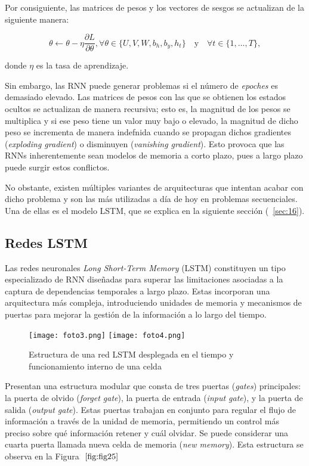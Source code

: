 \documentclass[12pt,twoside]{article}
\begin{document}
Por consiguiente, las matrices de pesos y los vectores de sesgos se actualizan de la siguiente manera: 

\begin{equation}
\theta \leftarrow \theta - \eta  \frac{\partial L}{\partial \theta}, \forall \theta \in \{U,V,W,b_h,b_y, h_t \} \text{  }\text{ y }\text{  } \forall t \in \{ 1,...,T\},
\end{equation}

donde $\eta$ es la tasa de aprendizaje.

Sin embargo, las RNN puede generar problemas si el número de \textit{epoches} es demasiado elevado. Las matrices de pesos con las que se obtienen los estados ocultos se actualizan de manera recursiva; esto es, la magnitud de los pesos se multiplica y si ese peso tiene un valor muy bajo o elevado, la magnitud de dicho peso se incrementa de manera indefnida cuando se propagan dichos gradientes (\textit{exploding gradient}) o disminuyen (\textit{vanishing gradient}). Esto provoca que las RNNs inherentemente sean modelos de memoria a corto plazo, pues a largo plazo puede surgir estos conflictos.

No obstante, existen múltiples variantes de arquitecturas que intentan acabar con dicho problema y son las más utilizadas a día de hoy en problemas secuenciales. Una de ellas es el modelo LSTM, que se explica en la siguiente sección (~\ref{sec:16}).


\subsection{Redes LSTM}\label{sec:17}

Las redes neuronales \textit{Long Short-Term Memory} (LSTM) constituyen un tipo especializado de RNN diseñadas para superar las limitaciones asociadas a la captura de dependencias temporales a largo plazo. Estas incorporan una arquitectura más compleja, introduciendo unidades de memoria y mecanismos de puertas para mejorar la gestión de la información a lo largo del tiempo.

\begin{figure}[h]
    \centering
    \texttt{[image: foto3.png]}
    \texttt{[image: foto4.png]}
    \caption{Estructura de una red LSTM desplegada en el tiempo y funcionamiento interno de una celda} 
    \label{fig:fig25}
\end{figure}


Presentan una estructura modular que consta de tres puertas (\textit{gates}) principales: la puerta de olvido (\textit{forget gate}), la puerta de entrada (\textit{input gate}), y la puerta de salida (\textit{output gate}). Estas puertas trabajan en conjunto para regular el flujo de información a través de la unidad de memoria, permitiendo un control más preciso sobre qué información retener y cuál olvidar. Se puede considerar una cuarta puerta llamada nueva celda de memoria (\textit{new memory}). Esta estructura se observa en la Figura $~\ref{fig:fig25}$
\end{document}

